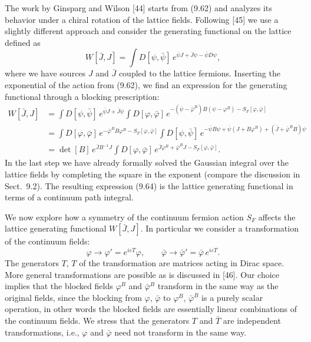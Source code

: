 The work by Ginsparg and Wilson [44] starts from (9.62) and analyzes its
behavior under a chiral rotation of the lattice fields. Following [45] we use
a slightly different approach and consider the generating functional on the
lattice defined as
\begin{equation}
  W[\bar J,J] = \int D[\psi,\bar\psi]\,e^{\bar\psi J + \bar J\psi - \bar\psi D\psi} ,
\end{equation}
where we have sources $J$ and $\bar J$ coupled to the lattice fermions.
Inserting the exponential of the action from (9.62), we find an expression for
the generating functional through a blocking prescription:
\begin{align}
  W[\bar J,J] &= \int D[\psi,\bar\psi]\,e^{\bar\psi J + \bar J\psi}
    \int D[\varphi,\bar\varphi]\,
    e^{-(\bar\psi-\bar\varphi^B)B(\psi-\varphi^B) - S_F[\varphi,\bar\varphi]} \nonumber\\
  &= \int D[\varphi,\bar\varphi]\,e^{-\bar\varphi^B B\varphi^B - S_F[\varphi,\bar\varphi]}
    \int D[\psi,\bar\psi]\,
    e^{-\bar\psi B\psi + \bar\psi(J+B\varphi^B) + (\bar J+\bar\varphi^B B)\psi} \nonumber\\
  &= \det[B]\,e^{\bar J B^{-1} J}\int D[\varphi,\bar\varphi]\,
    e^{\bar J\varphi^B + \bar\varphi^B J - S_F[\varphi,\bar\varphi]} .
\end{align}
In the last step we have already formally solved the Gaussian integral over
the lattice fields by completing the square in the exponent (compare the
discussion in Sect.~9.2). The resulting expression (9.64) is the lattice
generating functional in terms of a continuum path integral.

We now explore how a symmetry of the continuum fermion action $S_F$ affects
the lattice generating functional $W[\bar J,J]$. In particular we consider a
transformation of the continuum fields:
\begin{equation}
  \varphi \to \varphi' = e^{i\varepsilon T}\varphi , \qquad
  \bar\varphi \to \bar\varphi' = \bar\varphi\,e^{i\varepsilon T} .
\end{equation}
The generators $T$, $T$ of the transformation are matrices acting in Dirac
space. More general transformations are possible as is discussed in [46]. Our
choice implies that the blocked fields $\varphi^B$ and $\bar\varphi^B$
transform in the same way as the original fields, since the blocking from
$\varphi$, $\bar\varphi$ to $\varphi^B$, $\bar\varphi^B$ is a purely scalar
operation, in other words the blocked fields are essentially linear
combinations of the continuum fields. We stress that the generators $T$ and
$\bar T$ are independent transformations, i.e., $\varphi$ and $\bar\varphi$
need not transform in the same way.

